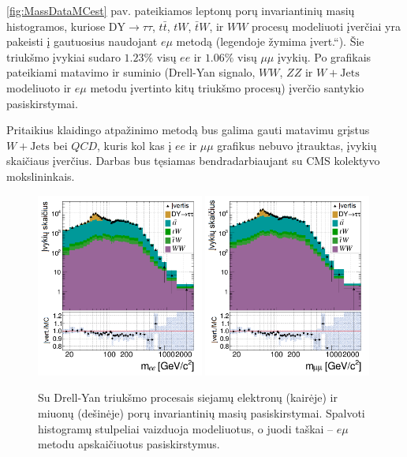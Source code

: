 \documentclass[a4paper, 12pt, oneside]{article}
\newcommand{\tbarW}{\bar{t}W}
\newcommand{\ttbar}{t\bar{t}}
\newcommand{\emu}{e\mu}
\newcommand{\WJets}{W\! +\!\mathrm{Jets}}
\newcommand{\DYtau}{\mathrm{DY} \! \rightarrow \! \tau\tau}
\newcommand{\ltq}[1]{{\quotedblbase{}#1\textquotedblleft{}}}
\newcommand{\QCD}{QC\! D}
\newlength\q
\begin{document}
\ref{fig:MassDataMCest} pav. pateikiamos leptonų porų invariantinių masių histogramos, kuriose $\DYtau$, $\ttbar$,
$tW$, $\tbarW$, ir $WW$ procesų modeliuoti įverčiai yra pakeisti į gautuosius naudojant $\emu$ metodą (legendoje žymima
\ltq{įvert.}).
Šie triukšmo įvykiai sudaro $1.23\%$ visų $ee$ ir $1.06\%$ visų $\mu\mu$ įvykių.
Po grafikais pateikiami matavimo ir suminio (Drell-Yan signalo, $WW$, $ZZ$ ir $W+\mathrm{Jets}$ modeliuoto ir 
$e\mu$ metodu įvertinto kitų triukšmo procesų) įverčio santykio pasiskirstymai.

Pritaikius klaidingo atpažinimo metodą bus galima gauti matavimu grįstus $\WJets$ bei $\QCD$, kuris kol kas į $ee$ ir $\mu\mu$ grafikus
nebuvo įtrauktas, įvykių skaičiaus įverčius.
Darbas bus tęsiamas bendradarbiaujant su CMS kolektyvo mokslininkais.

\begin{figure}[H]
	\includegraphics[width=0.49\textwidth]{ee_bkg_est.png}
	\includegraphics[width=0.49\textwidth]{mumu_bkg_est.png}
	\caption{\label{fig:bkgEst}
		Su Drell-Yan triukšmo procesais siejamų elektronų (kairėje) ir miuonų (dešinėje) porų invariantinių masių pasiskirstymai.
		Spalvoti histogramų stulpeliai vaizduoja modeliuotus, o juodi taškai -- $\emu$ metodu apskaičiuotus pasiskirstymus.}
\end{figure}
\end{document}
